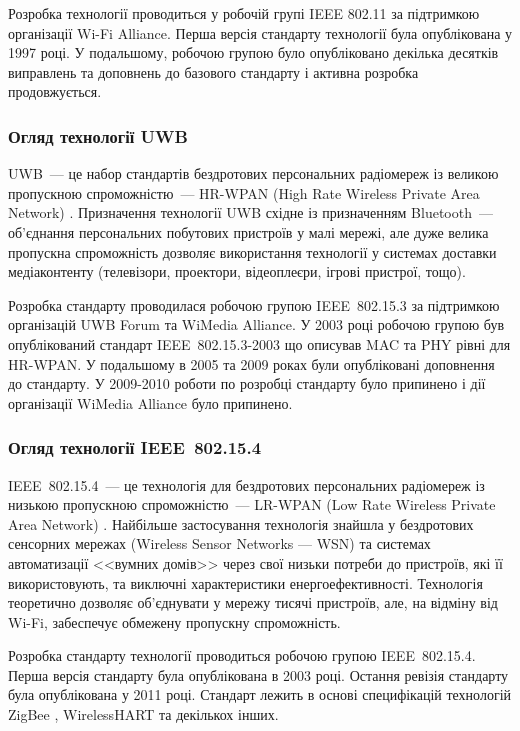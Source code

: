 \documentclass[a4paper,ukrainian,utf8,nocolumnsxix,floatsection,equationsection]{eskdtext}
\renewcommand\paragraph{\subsubsection}
\newcommand{\iee}[0]{IEEE~802.15.4\xspace}
\newcommand{\engtxt}[1]{\foreignlanguage{english}{#1}}
\begin{document}
Розробка технології проводиться у робочій групі IEEE 802.11 за підтримкою організації Wi-Fi Alliance. Перша версія стандарту технології була опублікована у 1997 році. У подальшому, робочою групою було опубліковано декілька десятків виправлень та доповнень до базового стандарту і активна розробка продовжується.

\paragraph{Огляд технології UWB} %
\label{par:uwb}

UWB~--- це набор стандартів бездротових персональних радіомереж із великою пропускною спроможністю~--- HR-WPAN (High Rate Wireless Private Area Network) \cite{comparative:wireless:protocols}. Призначення технології UWB східне із призначенням Bluetooth~--- об’єднання  персональних побутових пристроїв у малі мережі, але дуже велика пропускна спроможність дозволяє використання технології у системах доставки медіаконтенту (телевізори, проектори, відеоплеєри, ігрові пристрої, тощо).

Розробка стандарту проводилася робочою групою IEEE~802.15.3 за підтримкою організацій UWB Forum та WiMedia Alliance. У 2003 році робочою групою був опублікований стандарт IEEE~802.15.3-2003 що описував MAC та PHY рівні для HR-WPAN. У подальшому в 2005 та 2009 роках були опубліковані доповнення до стандарту. У 2009-2010 роботи по розробці стандарту було припинено і дії організації WiMedia Alliance було припинено.

\paragraph{Огляд технології \iee}
\label{par:iee}

\iee~--- це технологія для бездротових персональних радіомереж із низькою пропускною спроможністю~--- LR-WPAN (\engtxt{Low Rate Wireless Private Area Network}) \cite{comparative:wireless:protocols}. Найбільше застосування технологія знайшла у бездротових сенсорних мережах (Wireless Sensor Networks --- WSN) та системах автоматизації <<вумних домів>> через свої низьки потреби до пристроїв, які її використовують, та виключні характеристики енергоефективності. Технологія теоретично дозволяє об’єднувати у мережу тисячі пристроїв, але, на відміну від Wi-Fi, забеспечує обмежену пропускну спроможність. 

Розробка стандарту технології проводиться робочою групою \iee. Перша версія стандарту була опублікована в 2003 році. Остання ревізія стандарту була опублікована у 2011 році. Стандарт лежить в основі специфікацій технологій ZigBee \cite{zigbee:core:spec}, WirelessHART \cite{wihart:zigbee:comparison} та декількох інших.
\end{document}
